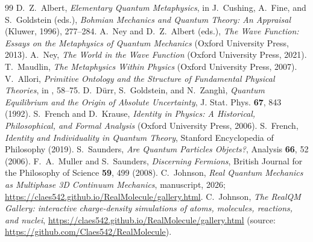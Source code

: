 \documentclass[11pt]{article}
\begin{document}
\begin{thebibliography}{99}
 D.~Z.~Albert, \emph{Elementary Quantum Metaphysics}, in J.~Cushing, A.~Fine, and
S.~Goldstein (eds.), \emph{Bohmian Mechanics and Quantum Theory: An Appraisal} (Kluwer, 1996), 277--284.
 A.~Ney and D.~Z.~Albert (eds.), \emph{The Wave Function: Essays on the Metaphysics
of Quantum Mechanics} (Oxford University Press, 2013).
 A.~Ney, \emph{The World in the Wave Function} (Oxford University Press, 2021).
 T.~Maudlin, \emph{The Metaphysics Within Physics} (Oxford University Press, 2007).
 V.~Allori, \emph{Primitive Ontology and the Structure of Fundamental Physical
Theories}, in \cite{NeyAlbert2013}, 58--75.
 D.~D\"urr, S.~Goldstein, and N.~Zangh\`i, \emph{Quantum Equilibrium and the Origin of
Absolute Uncertainty}, J. Stat. Phys. \textbf{67}, 843 (1992).
 S.~French and D.~Krause, \emph{Identity in Physics: A Historical, Philosophical,
and Formal Analysis} (Oxford University Press, 2006).
 S.~French, \emph{Identity and Individuality in Quantum Theory}, Stanford Encyclopedia
of Philosophy (2019).
 S.~Saunders, \emph{Are Quantum Particles Objects?}, Analysis \textbf{66}, 52 (2006).
 F.~A.~Muller and S.~Saunders, \emph{Discerning Fermions}, British Journal for
the Philosophy of Science \textbf{59}, 499 (2008).
 C.~Johnson, \emph{Real Quantum Mechanics as Multiphase 3D Continuum Mechanics},
manuscript, 2026; \url{https://claes542.github.io/RealMolecule/gallery.html}.
 C.~Johnson, \emph{The RealQM Gallery: interactive charge-density simulations of
atoms, molecules, reactions, and nuclei}, \url{https://claes542.github.io/RealMolecule/gallery.html}
(source: \url{https://github.com/Claes542/RealMolecule}).
\end{thebibliography}
\end{document}
